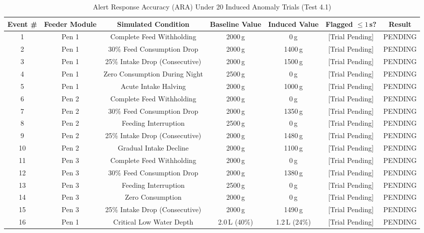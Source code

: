 \begin{table}[htbp!]
\centering
\caption{Alert Response Accuracy (ARA) Under 20 Induced Anomaly Trials (Test 4.1)}
\label{tab:ara_20_anomalies}
\begin{adjustbox}{width=\textwidth}
\begin{tabular}{ccccccc}
\toprule
\textbf{Event \#} & \textbf{Feeder Module} & \textbf{Simulated Condition} & \textbf{Baseline Value} & \textbf{Induced Value} & \textbf{Flagged $\le 1$\,s?} & \textbf{Result} \\
\midrule
1 & Pen 1 & Complete Feed Withholding & 2000\,g & 0\,g & [Trial Pending] & PENDING \\
2 & Pen 1 & 30\% Feed Consumption Drop & 2000\,g & 1400\,g & [Trial Pending] & PENDING \\
3 & Pen 1 & 25\% Intake Drop (Consecutive) & 2000\,g & 1500\,g & [Trial Pending] & PENDING \\
4 & Pen 1 & Zero Consumption During Night & 2500\,g & 0\,g & [Trial Pending] & PENDING \\
5 & Pen 1 & Acute Intake Halving & 2000\,g & 1000\,g & [Trial Pending] & PENDING \\
6 & Pen 2 & Complete Feed Withholding & 2000\,g & 0\,g & [Trial Pending] & PENDING \\
7 & Pen 2 & 30\% Feed Consumption Drop & 2000\,g & 1350\,g & [Trial Pending] & PENDING \\
8 & Pen 2 & Feeding Interruption & 2500\,g & 0\,g & [Trial Pending] & PENDING \\
9 & Pen 2 & 25\% Intake Drop (Consecutive) & 2000\,g & 1480\,g & [Trial Pending] & PENDING \\
10 & Pen 2 & Gradual Intake Decline & 2000\,g & 1100\,g & [Trial Pending] & PENDING \\
11 & Pen 3 & Complete Feed Withholding & 2000\,g & 0\,g & [Trial Pending] & PENDING \\
12 & Pen 3 & 30\% Feed Consumption Drop & 2000\,g & 1380\,g & [Trial Pending] & PENDING \\
13 & Pen 3 & Feeding Interruption & 2500\,g & 0\,g & [Trial Pending] & PENDING \\
14 & Pen 3 & Zero Consumption & 2000\,g & 0\,g & [Trial Pending] & PENDING \\
15 & Pen 3 & 25\% Intake Drop (Consecutive) & 2000\,g & 1490\,g & [Trial Pending] & PENDING \\
16 & Pen 1 & Critical Low Water Depth & 2.0\,L (40\%) & 1.2\,L (24\%) & [Trial Pending] & PENDING \\

\end{tabular}
\end{adjustbox}
\end{table}
